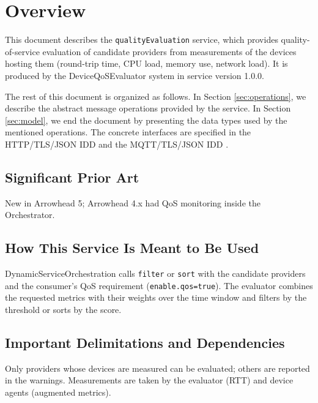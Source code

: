 \documentclass[a4paper]{arrowhead}
\begin{document}
\section{Overview}
\label{sec:overview}

This document describes the \texttt{qualityEvaluation} service, which provides quality-of-service evaluation of candidate providers from measurements of the devices hosting them (round-trip time, CPU load, memory use, network load).
It is produced by the DeviceQoSEvaluator system \cite{dqe-sysd} in service version 1.0.0.

The rest of this document is organized as follows.
In Section \ref{sec:operations}, we describe the abstract message operations provided by the service.
In Section \ref{sec:model}, we end the document by presenting the data types used by the mentioned operations.
The concrete interfaces are specified in the HTTP/TLS/JSON IDD \cite{dqe-qualityEvaluation-http-idd} and the MQTT/TLS/JSON IDD \cite{dqe-qualityEvaluation-mqtt-idd}.

\subsection{Significant Prior Art}

New in Arrowhead 5; Arrowhead 4.x had QoS monitoring inside the Orchestrator.

\subsection{How This Service Is Meant to Be Used}

Dynamic\allowbreak{}Service\allowbreak{}Orchestration calls \texttt{filter} or \texttt{sort} with the candidate providers and the consumer's QoS requirement (\texttt{enable.\allowbreak{}qos=\allowbreak{}true}). The evaluator combines the requested metrics with their weights over the time window and filters by the threshold or sorts by the score.

\subsection{Important Delimitations and Dependencies}
\label{sec:delimitations}

Only providers whose devices are measured can be evaluated; others are reported in the warnings. Measurements are taken by the evaluator (RTT) and device agents (augmented metrics).

\newpage
\end{document}
